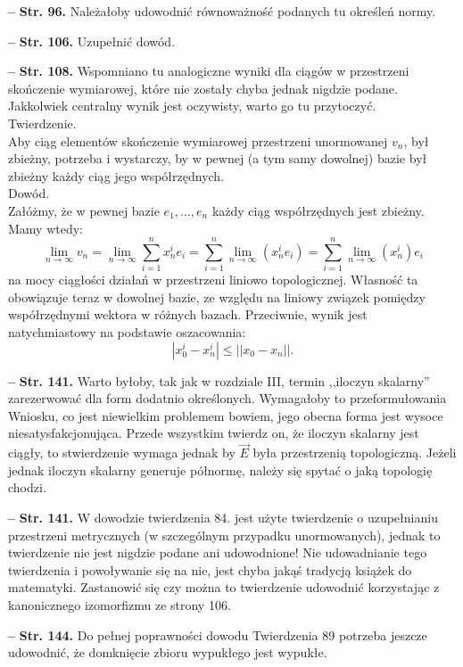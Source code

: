 \documentclass[a4paper]{article}
\newcommand{\tb}{\textbf}
\newcommand{\noi}{\noindent}
\newcommand{\start}{\noi \tb{--} {}}
\newcommand{\Str}[1]{\tb{Str. #1.}}
\begin{document}
\start \Str{96} Należałoby udowodnić równoważność podanych tu określeń
normy.

\start \Str{106} Uzupełnić dowód.

\start \Str{108} Wspomniano tu analogiczne wyniki dla ciągów w
przestrzeni skończenie wymiarowej, które nie zostały chyba jednak
nigdzie podane. Jakkolwiek centralny wynik jest oczywisty, warto
go tu przytoczyć.\\
Twierdzenie.\\
Aby ciąg elementów skończenie wymiarowej przestrzeni unormowanej
$v_{ n }$, był zbieżny, potrzeba i wystarczy, by w pewnej (a tym samy
dowolnej) bazie był zbieżny każdy ciąg jego
współrzędnych.\\
Dowód.\\
Załóżmy, że w pewnej bazie $e_{ 1 }, \ldots, e_{ n }$ każdy ciąg
współrzędnych jest zbieżny. Mamy wtedy:
$$\lim_{ n \rightarrow
  \infty } v_{ n } = \lim_{ n \rightarrow \infty } \sum_{ i = 1 }^{ n
} x_{ n }^{ i } e_{ i } = \sum_{ i = 1 }^{ n } \lim_{ n \rightarrow
  \infty }( x_{ n }^{ i } e_{ i } ) = \sum_{ i = 1 }^{ n } \lim_{ n
  \rightarrow \infty }( x_{ n }^{ i } ) e_{ i }$$ na mocy ciągłości
działań w przestrzeni liniowo topologicznej. Własność ta obowiązuje
teraz w dowolnej bazie, ze względu na liniowy związek pomiędzy
współrzędnymi wektora w różnych bazach. Przeciwnie, wynik jest
natychmiastowy na podstawie oszacowania:
$$| x_{ 0 }^{ i } - x_{ n }^{ i } | \leq || x_{ 0 } - x_{ n } ||\textrm{.}$$

\start \Str{141} Warto byłoby, tak jak w rozdziale III, termin
,,iloczyn skalarny'' zarezerwować dla form dodatnio określonych.
Wymagałoby to przeformułowania Wniosku, co jest niewielkim problemem
bowiem, jego obecna forma jest wysoce niesatysfakcjonująca. Przede
wszystkim twierdz on, że iloczyn skalarny jest ciągły, to stwierdzenie
wymaga jednak by $\vec{ E }$ była przestrzenią topologiczną. Jeżeli
jednak iloczyn skalarny generuje półnormę, należy się spytać o jaką
topologię chodzi.
  
\start \Str{141} W dowodzie twierdzenia 84. jest użyte twierdzenie o
uzupełnianiu przestrzeni metrycznych (w szczególnym przypadku
unormowanych), jednak to twierdzenie nie jest nigdzie podane ani
udowodnione! Nie udowadnianie tego twierdzenia i powoływanie się na
nie, jest chyba jakąś tradycją książek do matematyki. Zastanowić się
czy można to twierdzenie udowodnić korzystając z kanonicznego
izomorfizmu ze strony 106.

\start \Str{144} Do pełnej poprawności dowodu Twierdzenia 89 potrzeba
jeszcze udowodnić, że domknięcie zbioru wypukłego jest wypukłe.
\end{document}

